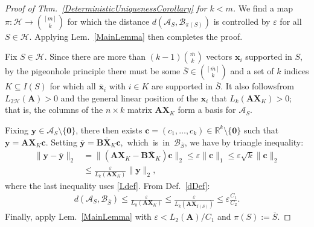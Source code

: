 \documentclass[journal, twocolumn]{IEEEtran}
\begin{document}
\begin{proof}[Proof of Thm.~\ref{DeterministicUniquenessCorollary} for $k < m$] 
We find a map $\pi: \mathcal{H} \to {[m] \choose k}$ for which the distance $d(\bm{\mathcal{A}}_S, \bm{\mathcal{B}}_{\pi(S)})$ is controlled by $\varepsilon$ for all $S \in \mathcal{H}$. Applying Lem.~\ref{MainLemma} then completes the proof.

Fix $S \in \mathcal{H}$. Since there are more than $(k-1){\overline m \choose k}$ vectors $\mathbf{x}_i$ supported in $S$, by the pigeonhole principle there must be some $\overline S \in {[\overline m] \choose k}$ and a set of $k$ indices $K \subseteq I(S)$ for which all $\mathbf{\overline x}_i$ with $i \in K$ are supported in $\overline S$.
It also follows\footnotemark[\ref{note1}] from $L_{2\mathcal{H}}(\mathbf{A}) > 0$ and the general linear position of the $\mathbf{x}_i$ that $L_k(\mathbf{AX}_{K}) > 0$; that is, the columns of the $n \times k$ matrix $\mathbf{AX}_K$ form a basis for $\bm{\mathcal{A}}_S$. 

Fixing $\mathbf{y} \in \bm{\mathcal{A}}_S \setminus \{\mathbf{0}\}$, there then exists $\mathbf{c} = (c_1, \ldots, c_k) \in \mathbb{R}^k \setminus \{\mathbf{0}\}$ such that $\mathbf{y} = \mathbf{AX}_K\mathbf{c}$. Setting \mbox{$\mathbf{\overline{y}} = \mathbf{B\overline{X}}_K\mathbf{c}$, which is in $\bm{\mathcal{B}}_{\overline S}$}, we have by triangle inequality:
\begin{align*}
\|\mathbf{y} - \mathbf{\overline{y}}\|_2 
&= \|(\mathbf{AX}_K - \mathbf{B\overline{X}}_K)\mathbf{c}\|_2
\leq \varepsilon \|\mathbf{c}\|_1
\leq \varepsilon \sqrt{k}  \|\mathbf{c}\|_2  \\
&\leq \frac{\varepsilon}{L_k(\mathbf{AX}_K)} \|\mathbf{y}\|_2,
\end{align*}
where the last inequality uses \eqref{Ldef}. From Def.~\ref{dDef}:
\begin{align}\label{rhs222}
d(\bm{\mathcal{A}}_S, \bm{\mathcal{B}}_{\overline S}) 
\leq \frac{\varepsilon}{  L_k(\mathbf{AX}_{K}) } 
\leq \frac{\varepsilon}{  L_k(\mathbf{AX}_{I(S)}) } 
\leq \varepsilon \frac{C_1}{C_2}.
\end{align}
%
Finally, apply Lem.~\ref{MainLemma} with $\varepsilon < L_2(\mathbf{A})/C_1$ and $\pi(S) := \overline S$. %
\end{proof}
\end{document}
